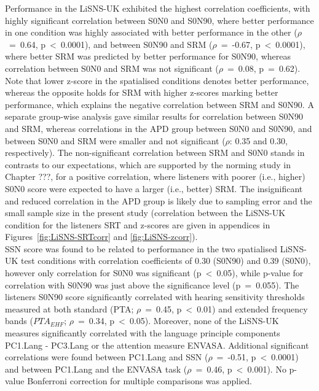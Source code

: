 \documentclass[a4paper, twoside]{templates/ociamthesis}
\begin{document}
Performance in the LiSNS-UK exhibited the highest correlation coefficients, with highly significant correlation between S0N0 and S0N90, where better performance in one condition was highly associated with better performance in the other (\(\rho\)~=~0.64, p~\textless~0.0001), and between S0N90 and SRM (\(\rho\)~=~-0.67, p~\textless~0.0001), where better SRM was predicted by better performance for S0N90, whereas correlation between S0N0 and SRM was not significant (\(\rho\)~=~0.08, p~=~0.62). Note that lower z-score in the spatialised conditions denotes better performance, whereas the opposite holds for SRM with higher z-scores marking better performance, which explains the negative correlation between SRM and S0N90. A separate group-wise analysis gave similar results for correlation between S0N90 and SRM, whereas correlations in the APD group between S0N0 and S0N90, and between S0N0 and SRM were smaller and not significant (\(\rho\): 0.35 and 0.30, respectively). The non-significant correlation between SRM and S0N0 stands in contrasts to our expectations, which are supported by the norming study in Chapter ???, for a positive correlation, where listeners with poorer (i.e., higher) S0N0 score were expected to have a larger (i.e., better) SRM. The insignificant and reduced correlation in the APD group is likely due to sampling error and the small sample size in the present study (correlation between the LiSNS-UK condition for the listeners SRT and z-scores are given in appendices in Figures~\ref{fig:LiSNS-SRTcorr} and \ref{fig:LiSNS-zcorr}).\\

SSN score was found to be related to performance in the two spatialised LiSNS-UK test conditions with correlation coefficients of 0.30 (S0N90) and 0.39 (S0N0), however only correlation for S0N0 was significant (p~\textless~0.05), while p-value for correlation with S0N90 was just above the significance level (p~=~0.055). The listeners S0N90 score significantly correlated with hearing sensitivity thresholds measured at both standard (PTA; \(\rho\)~=~0.45, p~\textless~0.01) and extended frequency bands (\(PTA_{EHF}\); \(\rho\)~=~0.34, p~\textless~0.05). Moreover, none of the LiSNS-UK measures significantly correlated with the language principle components PC1.Lang - PC3.Lang or the attention measure ENVASA. Additional significant correlations were found between PC1.Lang and SSN (\(\rho\)~=~-0.51, p~\textless~0.0001) and between PC1.Lang and the ENVASA task (\(\rho\)~=~0.46, p~\textless~0.001). No p-value Bonferroni correction for multiple comparisons was applied.
\end{document}
